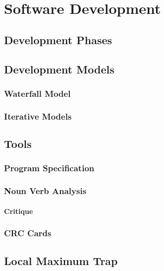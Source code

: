\chapter{Software Development}

\section{Development Phases}

\section{Development Models}
\subsection{Waterfall Model}
\subsection{Iterative Models}

\section{Tools}
\subsection{Program Specification}
\subsection{Noun Verb Analysis}
\subsubsection{Critique}
\subsection{CRC Cards}

\section{Local Maximum Trap}


